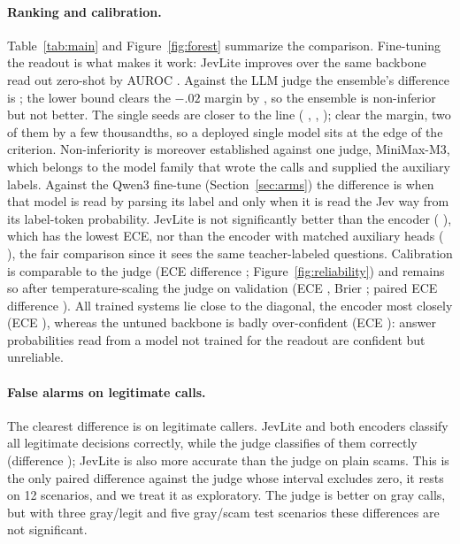 \documentclass[11pt]{article}
\begin{document}
\paragraph{Ranking and calibration.} Table~\ref{tab:main} and Figure~\ref{fig:forest} summarize the comparison. Fine-tuning the readout is what makes it work: JevLite improves over the same backbone read out zero-shot by \dzsauroc{} AUROC \dzsaurocci{}. Against the LLM judge the ensemble's difference is \dmthreeauroc{} \dmthreeaurocci{}; the lower bound clears the $-.02$ margin by \nimargin{}, so the ensemble is non-inferior but not better. The single seeds are closer to the line (\seedAdelta{} \seedAdeltaci{}, \seedBdelta{} \seedBdeltaci{}, \seedCdelta{} \seedCdeltaci{}); \seedsPassing{} clear the margin, two of them by a few thousandths, so a deployed single model sits at the edge of the criterion. Non-inferiority is moreover established against one judge, MiniMax-M3, which belongs to the model family that wrote the calls and supplied the auxiliary labels. Against the Qwen3 fine-tune (Section~\ref{sec:arms}) the difference is \dgenlabauroc{} \dgenlabaurocci{} when that model is read by parsing its label and only \dgenauroc{} \dgenaurocci{} when it is read the Jev way from its label-token probability. JevLite is not significantly better than the encoder (\dmbauroc{} \dmbaurocci{}), which has the lowest ECE, nor than the encoder with matched auxiliary heads (\mbauxdelta{} \mbauxdeltaci{}), the fair comparison since it sees the same teacher-labeled questions. Calibration is comparable to the judge (ECE difference \dmthreeece{} \dmthreeececi{}; Figure~\ref{fig:reliability}) and remains so after temperature-scaling the judge on validation (ECE \mthreeTece{}, Brier \mthreeTbrier{}; paired ECE difference \eceDiffMthreeT{} \eceDiffMthreeTci{}). All trained systems lie close to the diagonal, the encoder most closely (ECE \mbece{}), whereas the untuned backbone is badly over-confident (ECE \zsece{}): answer probabilities read from a model not trained for the readout are confident but unreliable.

\paragraph{False alarms on legitimate calls.} The clearest difference is on legitimate callers. JevLite and both encoders classify all legitimate decisions correctly, while the judge classifies \mthreefamLegit{} of them correctly (difference \dmthreelegit{} \dmthreelegitci{}); JevLite is also more accurate than the judge on plain scams. This is the only paired difference against the judge whose interval excludes zero, it rests on 12 scenarios, and we treat it as exploratory. The judge is better on gray calls, but with three gray/legit and five gray/scam test scenarios these differences are not significant.
\end{document}
